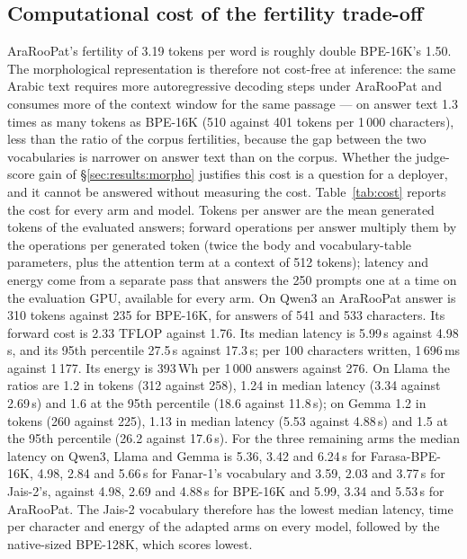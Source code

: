 \documentclass[a4paper,fleqn]{cas-sc}
\begin{document}
\subsection{Computational cost of the fertility trade-off}
\label{sec:results:cost}

AraRooPat's fertility of 3.19 tokens per word is roughly double BPE-16K's 1.50. The morphological representation is therefore not cost-free at inference: the same Arabic text requires more autoregressive decoding steps under AraRooPat and consumes more of the context window for the same passage --- on answer text 1.3 times as many tokens as BPE-16K (510 against 401 tokens per 1\,000 characters), less than the ratio of the corpus fertilities, because the gap between the two vocabularies is narrower on answer text than on the corpus. Whether the judge-score gain of \S\ref{sec:results:morpho} justifies this cost is a question for a deployer, and it cannot be answered without measuring the cost.
Table~\ref{tab:cost} reports the cost for every arm and model. Tokens per answer are the mean generated tokens of the evaluated answers; forward operations per answer multiply them by the operations per generated token (twice the body and vocabulary-table parameters, plus the attention term at a context of 512 tokens); latency and energy come from a separate pass that answers the 250 prompts one at a time on the evaluation GPU, available for every arm. On Qwen3 an AraRooPat answer is 310 tokens against 235 for BPE-16K, for answers of 541 and 533 characters. Its forward cost is 2.33 TFLOP against 1.76. Its median latency is 5.99\,s against 4.98\,s, and its 95th percentile 27.5\,s against 17.3\,s; per 100 characters written, 1\,696\,ms against 1\,177. Its energy is 393\,Wh per 1\,000 answers against 276. On Llama the ratios are 1.2 in tokens (312 against 258), 1.24 in median latency (3.34 against 2.69\,s) and 1.6 at the 95th percentile (18.6 against 11.8\,s); on Gemma 1.2 in tokens (260 against 225), 1.13 in median latency (5.53 against 4.88\,s) and 1.5 at the 95th percentile (26.2 against 17.6\,s). For the three remaining arms the median latency on Qwen3, Llama and Gemma is 5.36, 3.42 and 6.24\,s for Farasa-BPE-16K, 4.98, 2.84 and 5.66\,s for Fanar-1's vocabulary and 3.59, 2.03 and 3.77\,s for Jais-2's, against 4.98, 2.69 and 4.88\,s for BPE-16K and 5.99, 3.34 and 5.53\,s for AraRooPat. The Jais-2 vocabulary therefore has the lowest median latency, time per character and energy of the adapted arms on every model, followed by the native-sized BPE-128K, which scores lowest.
\end{document}
